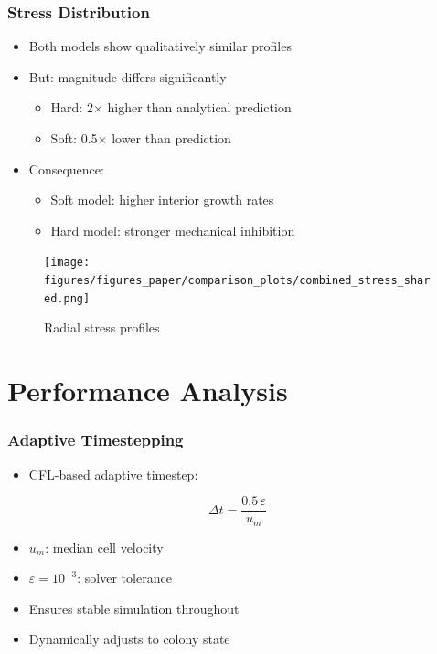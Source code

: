 \documentclass[
	10pt,
	t
]{beamer}
\begin{document}
\begin{frame}
    \frametitle{Stress Distribution}

    \begin{itemize}
        \item Both models show qualitatively similar profiles
        \item But: magnitude differs significantly
              \begin{itemize}
                  \item Hard: 2$\times$ higher than analytical prediction
                  \item Soft: 0.5$\times$ lower than prediction
              \end{itemize}
        \item Consequence:
              \begin{itemize}
                  \item Soft model: higher interior growth rates
                  \item Hard model: stronger mechanical inhibition
              \end{itemize}
    \end{itemize}

    \vspace{0.2cm}

    \begin{figure}
        \centering
        \texttt{[image: figures/figures\_paper/comparison\_plots/combined\_stress\_shared.png]}
        \caption{\scriptsize{Radial stress profiles}}
    \end{figure}

\end{frame}

\section{Performance Analysis}

\begin{frame}
    \frametitle{Adaptive Timestepping}

    \begin{itemize}
        \item CFL-based adaptive timestep:
    \end{itemize}

    \begin{equation*}
        \Delta t = \frac{0.5 \, \varepsilon}{u_m}
    \end{equation*}

    \begin{itemize}
        \item $u_m$: median cell velocity
        \item $\varepsilon = 10^{-3}$: solver tolerance
        \item Ensures stable simulation throughout
        \item Dynamically adjusts to colony state
    \end{itemize}

\end{frame}
\end{document}
